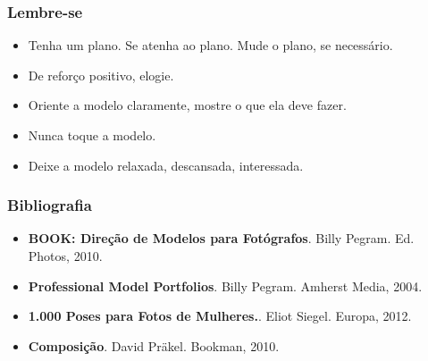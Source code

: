 \begin{frame}
  \frametitle{Lembre-se}
  \begin{itemize}
      \item Tenha um plano. Se atenha ao plano. Mude o plano, se necessário.
      \item De reforço positivo, elogie.
      \item Oriente a modelo claramente, mostre o que ela deve fazer.
      \item Nunca toque a modelo.
      \item Deixe a modelo relaxada, descansada, interessada.
  \end{itemize}
\end{frame}


\begin{frame}
    \frametitle{Bibliografia}
    \begin{itemize}
        \item \textbf{BOOK: Direção de Modelos para Fotógrafos}. Billy Pegram. Ed. Photos, 2010.
        \item \textbf{Professional Model Portfolios}. Billy Pegram. Amherst Media, 2004.
        \item \textbf{1.000 Poses para Fotos de Mulheres.}. Eliot Siegel. Europa, 2012.
        \item \textbf{Composição}. David Präkel. Bookman, 2010.
    \end{itemize}
\end{frame}


